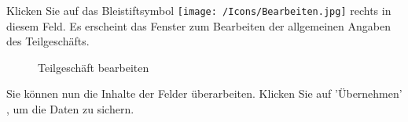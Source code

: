 Klicken Sie auf das Bleistiftsymbol \texttt{[image: /Icons/Bearbeiten.jpg]}  rechts in diesem Feld. Es erscheint das Fenster zum Bearbeiten der allgemeinen Angaben des Teilgeschäfts.

\begin{figure}[H]
\caption{Teilgeschäft bearbeiten}
\end{figure}

Sie können nun die Inhalte der Felder überarbeiten. Klicken Sie auf 'Übernehmen' , um die Daten zu sichern.
